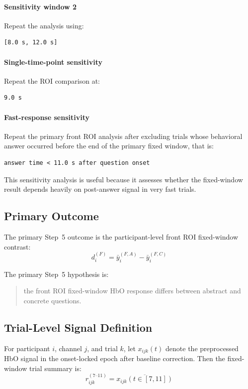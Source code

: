 \paragraph{Sensitivity window 2}
Repeat the analysis using:
\begin{verbatim}
[8.0 s, 12.0 s]
\end{verbatim}

\paragraph{Single-time-point sensitivity}
Repeat the ROI comparison at:
\begin{verbatim}
9.0 s
\end{verbatim}

\paragraph{Fast-response sensitivity}
Repeat the primary front ROI analysis after excluding trials whose behavioral answer occurred
before the end of the primary fixed window, that is:
\begin{verbatim}
answer time < 11.0 s after question onset
\end{verbatim}

This sensitivity analysis is useful because it assesses whether the fixed-window result depends
heavily on post-answer signal in very fast trials.

\subsection{Primary Outcome}
The primary Step~5 outcome is the participant-level front ROI fixed-window contrast:
\begin{equation}
d^{(F)}_i = \bar{y}^{(F,A)}_i - \bar{y}^{(F,C)}_i
\end{equation}

The primary Step~5 hypothesis is:
\begin{quote}
the front ROI fixed-window HbO response differs between abstract and concrete questions.
\end{quote}

\subsection{Trial-Level Signal Definition}
For participant \(i\), channel \(j\), and trial \(k\), let \(x_{ijk}(t)\) denote the preprocessed
HbO signal in the onset-locked epoch after baseline correction.
Then the fixed-window trial summary is:
\begin{equation}
r^{(7\text{--}11)}_{ijk}
=
\overline{x_{ijk}(t \in [7,11])}
\end{equation}

